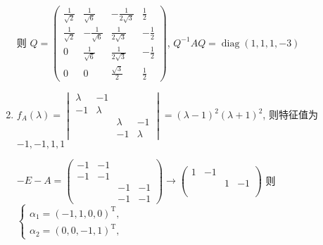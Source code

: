 \begin{enumerate}
                   则 \( Q = \begin{pmatrix}
                       \frac{1}{\sqrt{2}} & \frac{1}{\sqrt{6}}  & -\frac{1}{2\sqrt{3}} & \frac{1}{2}  \\
                       \frac{1}{\sqrt{2}} & -\frac{1}{\sqrt{6}} & \frac{1}{2\sqrt{3}}  & -\frac{1}{2} \\
                       0                  & \frac{1}{\sqrt{6}}  & \frac{1}{2\sqrt{3}}  & -\frac{1}{2} \\
                       0                  & 0                   & \frac{\sqrt{3}}{2}   & \frac{1}{2}
                   \end{pmatrix} \), \( Q^{-1}AQ = \operatorname{diag}(1, 1, 1, -3) \)
             \item %
                   \( f_{A}(\lambda) = \begin{vmatrix}
                       \lambda & -1      &         &         \\
                       -1      & \lambda &         &         \\
                               &         & \lambda & -1      \\
                               &         & -1      & \lambda
                   \end{vmatrix} = (\lambda-1)^{2}(\lambda+1)^{2} \), 则特征值为 \( -1, -1, 1, 1 \)

                   \( -E-A = \begin{pmatrix}
                       -1 & -1 &    &    \\
                       -1 & -1 &    &    \\
                          &    & -1 & -1 \\
                          &    & -1 & -1
                   \end{pmatrix} \rightarrow \begin{pmatrix}
                       1 & -1 &   &    \\
                         &    & 1 & -1 \\
                         &    &   &    \\
                         &    &   &
                   \end{pmatrix} \) 则 \( \begin{cases} \alpha_{1} = (-1, 1, 0, 0)^{\mathrm{T}}, \\ \alpha_{2} = (0, 0, -1, 1)^{\mathrm{T}}, \end{cases} \)


\end{enumerate}
